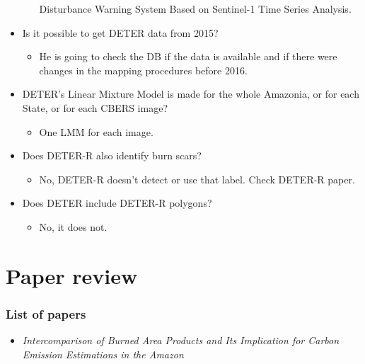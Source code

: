\documentclass{beamer}
\begin{document}
\begin{frame}[t, allowframebreaks]
\begin{itemize}
\begin{itemize}
                Disturbance Warning System Based on Sentinel-1 Time Series 
                Analysis.
        \end{itemize}
        \item Is it possible to get DETER data from 2015? 
        \begin{itemize}
            \item He is going to check the DB if the data is available and if
                there were changes in the mapping procedures before 2016.
        \end{itemize}
        \item DETER's Linear Mixture Model is made for the whole Amazonia, or
            for each State, or for each CBERS image?
        \begin{itemize}
            \item One LMM for each image.
        \end{itemize}
        \item Does DETER-R also identify burn scars? 
        \begin{itemize}
            \item No, DETER-R doesn't detect or use that label. Check DETER-R 
                paper.
        \end{itemize}
        \item Does DETER include DETER-R polygons?
        \begin{itemize}
            \item No, it does not.
        \end{itemize}
    \end{itemize}
\end{frame}



\section{Paper review}

\begin{frame}
    \frametitle{List of papers}
    \begin{itemize}
        \item \textit{Intercomparison of Burned Area Products and Its 
            Implication for Carbon Emission Estimations in the Amazon}
    \end{itemize}
\end{frame}
\end{document}
